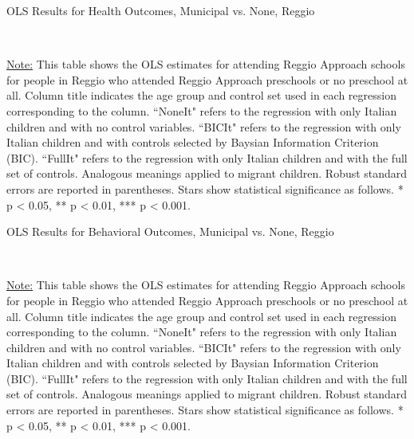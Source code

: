 \begin{table}[H] \caption{OLS Results for Health Outcomes, Municipal vs. None, Reggio} \label{ols-H-child-reg}

\vspace{1ex} \\
\footnotesize\raggedright{\underline{Note:} This table shows the OLS estimates for attending Reggio Approach schools for people in Reggio who attended Reggio Approach preschools or no preschool at all. Column title indicates the age group and control set used in each regression corresponding to the column. ``NoneIt" refers to the regression with only Italian children and with no control variables. ``BICIt" refers to the regression with only Italian children and with controls selected by Baysian Information Criterion (BIC). ``FullIt" refers to the regression with only Italian children and with the full set of controls. Analogous meanings applied to migrant children. Robust standard errors are reported in parentheses. Stars show statistical significance as follows. * p < 0.05, ** p < 0.01, *** p < 0.001.}
\end{table}

\begin{table}[H] \caption{OLS Results for Behavioral Outcomes, Municipal vs. None, Reggio} \label{ols-B-child-reg}

\vspace{1ex} \\
\footnotesize\raggedright{\underline{Note:} This table shows the OLS estimates for attending Reggio Approach schools for people in Reggio who attended Reggio Approach preschools or no preschool at all. Column title indicates the age group and control set used in each regression corresponding to the column. ``NoneIt" refers to the regression with only Italian children and with no control variables. ``BICIt" refers to the regression with only Italian children and with controls selected by Baysian Information Criterion (BIC). ``FullIt" refers to the regression with only Italian children and with the full set of controls. Analogous meanings applied to migrant children. Robust standard errors are reported in parentheses. Stars show statistical significance as follows. * p < 0.05, ** p < 0.01, *** p < 0.001.}
\end{table}

